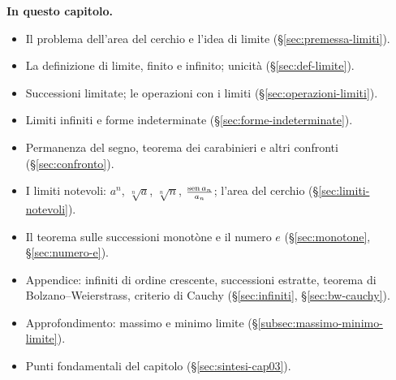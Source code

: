 \medskip
\noindent\textbf{In questo capitolo.}
\begin{itemize}
  \item Il problema dell'area del cerchio e l'idea di limite (\S\ref{sec:premessa-limiti}).
  \item La definizione di limite, finito e infinito; unicità (\S\ref{sec:def-limite}).
  \item Successioni limitate; le operazioni con i limiti (\S\ref{sec:operazioni-limiti}).
  \item Limiti infiniti e forme indeterminate (\S\ref{sec:forme-indeterminate}).
  \item Permanenza del segno, teorema dei carabinieri e altri confronti
  (\S\ref{sec:confronto}).
  \item I limiti notevoli: $a^{n}$, $\sqrt[n]a$, $\sqrt[n]n$, $\frac{\operatorname{sen} a_{n}}{a_{n}}$; l'area del
  cerchio (\S\ref{sec:limiti-notevoli}).
  \item Il teorema sulle successioni monotòne e il numero $e$ (\S\ref{sec:monotone},
  \S\ref{sec:numero-e}).
  \item Appendice: infiniti di ordine crescente, successioni estratte, teorema di
  Bolzano--Weierstrass, criterio di Cauchy (\S\ref{sec:infiniti}, \S\ref{sec:bw-cauchy}).
  \item Approfondimento: massimo e minimo limite (\S\ref{subsec:massimo-minimo-limite}).
  \item Punti fondamentali del capitolo (\S\ref{sec:sintesi-cap03}).
\end{itemize}













